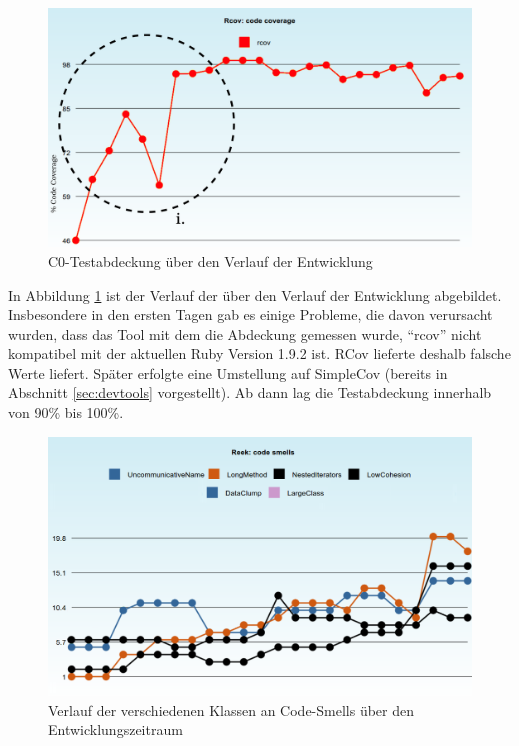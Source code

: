 \begin{figure}[htbp]
 \centering
 \includegraphics[width=\textwidth]{./diagrams/itjobs-coverage.pdf}
 \caption{C0-Testabdeckung über den Verlauf der Entwicklung}
 \label{fig:itjobsCoverage}
\end{figure}
In Abbildung \ref{fig:itjobsCoverage} ist der Verlauf der  über den Verlauf der Entwicklung abgebildet. Insbesondere in den ersten Tagen gab es einige Probleme, die davon verursacht wurden, dass das Tool mit dem die Abdeckung gemessen wurde, "`rcov"' nicht kompatibel mit der aktuellen Ruby Version 1.9.2 ist. RCov lieferte deshalb falsche Werte liefert. Später erfolgte eine Umstellung auf SimpleCov (bereits in Abschnitt \ref{sec:devtools} vorgestellt). Ab dann lag die Testabdeckung innerhalb von 90\% bis 100\%.

\begin{figure}[htbp]
 \centering
 \includegraphics[width=\textwidth]{./diagrams/itjobs-smells.png}
 \caption{Verlauf der verschiedenen Klassen an Code-Smells über den Entwicklungszeitraum}
 \label{fig:itjobsSmells}
\end{figure}


